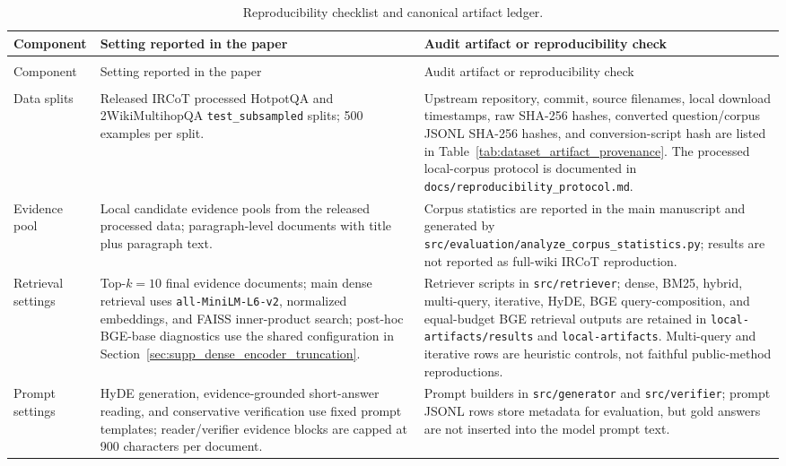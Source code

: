 \begingroup
\footnotesize
\setlength{\tabcolsep}{3pt}
\begin{longtable}{>{\raggedright\arraybackslash}p{}
                            >{\raggedright\arraybackslash}p{}
                            >{\raggedright\arraybackslash}p{}}
\caption{Reproducibility checklist and canonical artifact ledger.}
\label{tab:reproducibility_checklist}\\
\toprule
Component & Setting reported in the paper & Audit artifact or reproducibility check \\
\midrule
\endfirsthead
\multicolumn{3}{l}{\footnotesize\itshape Table~\thetable\ continued}\\
\toprule
Component & Setting reported in the paper & Audit artifact or reproducibility check \\
\midrule
\endhead
\midrule
\multicolumn{3}{r}{\footnotesize Continued on next page}\\
\endfoot
\bottomrule
\endlastfoot
Data splits & Released IRCoT processed HotpotQA and 2WikiMultihopQA \texttt{test\_subsampled} splits; 500 examples per split. & Upstream repository, commit, source filenames, local download timestamps, raw SHA-256 hashes, converted question/corpus JSONL SHA-256 hashes, and conversion-script hash are listed in Table~\ref{tab:dataset_artifact_provenance}. The processed local-corpus protocol is documented in \texttt{docs/reproducibility\_protocol.md}. \\
Evidence pool & Local candidate evidence pools from the released processed data; paragraph-level documents with title plus paragraph text. & Corpus statistics are reported in the main manuscript and generated by \texttt{src/evaluation/analyze\_corpus\_statistics.py}; results are not reported as full-wiki IRCoT reproduction. \\
Retrieval settings & Top-$k=10$ final evidence documents; main dense retrieval uses \texttt{all-MiniLM-L6-v2}, normalized embeddings, and FAISS inner-product search; post-hoc BGE-base diagnostics use the shared configuration in Section~\ref{sec:supp_dense_encoder_truncation}. & Retriever scripts in \texttt{src/retriever}; dense, BM25, hybrid, multi-query, iterative, HyDE, BGE query-composition, and equal-budget BGE retrieval outputs are retained in \texttt{local-artifacts/results} and \texttt{local-artifacts}. Multi-query and iterative rows are heuristic controls, not faithful public-method reproductions. \\
Prompt settings & HyDE generation, evidence-grounded short-answer reading, and conservative verification use fixed prompt templates; reader/verifier evidence blocks are capped at 900 characters per document. & Prompt builders in \texttt{src/generator} and \texttt{src/verifier}; prompt JSONL rows store metadata for evaluation, but gold answers are not inserted into the model prompt text. \\

\end{longtable}

